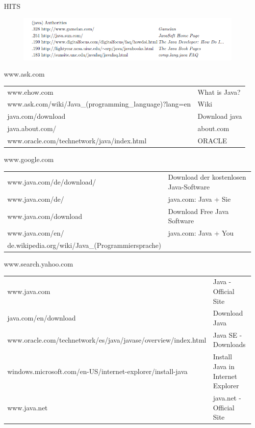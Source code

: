 \documentclass[hyperref={pdfpagelabels=false}]{beamer}
\begin{document}
\begin{frame} [allowframebreaks]
\framebreak


\begin{block}{HITS \cite{Kleinberg}}
	\begin{figure} [th]
		\includegraphics[scale=0.3]{java.png} 
	\end{figure}
\end{block}

\begin{block}{www.ask.com}
	\begin{tabular}{l l}
		www.ehow.com & What is Java? \\
		www.ask.com/wiki/Java\_(programming\_language)?lang=en & Wiki\\
		java.com/download & Download java\\
		java.about.com/ &  about.com\\
		www.oracle.com/technetwork/java/index.html & ORACLE\\
	\end{tabular}
\end{block}

\begin{block}{www.google.com}
	\begin{tabular}{l l}
		www.java.com/de/download/ & Download der kostenlosen Java-Software \\
		www.java.com/de/ & java.com: Java + Sie\\
		www.java.com/download & Download Free Java Software\\
		www.java.com/en/ & java.com: Java + You \\
		de.wikipedia.org/wiki/Java\_(Programmiersprache) & \\
	\end{tabular}
\end{block}

\begin{block}{www.search.yahoo.com}
	\begin{tabular}{l l}
		www.java.com & Java - Official Site \\
		java.com/en/download & Download Java \\
		www.oracle.com/technetwork/es/java/javase/overview/index.html & Java SE - Downloads \\
		windows.microsoft.com/en-US/internet-explorer/install-java & Install Java in Internet Explorer \\
		www.java.net & java.net - Official Site\\
	\end{tabular}
\end{block}


\end{frame}
\end{document}
